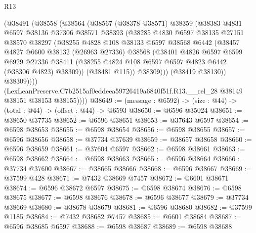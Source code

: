\begin{lexlean}{R13}
\begin{coremodule}
            (@38491
              (@38558
                (@38564
                  (@38567
                    (@38378 @38571)
                    @38359
                    (@38383
                      @4831
                      @6597
                      @38136
                      @37306
                      @38571
                      @38393
                      (@38285
                        @4830
                        @6597
                        @38135
                        @27151
                        @38570
                        @38297
                        (@38255
                          @4828
                          @108
                          @38133
                          @6597
                          @38568
                          @6442
                          (@38457
                            @4827
                            @6600
                            @38132
                            (@26963 @27336)
                            @38568
                            (@38401
                              @4826
                              @6597
                              @6599
                              @6929
                              @27336
                              @38411
                              (@38255 @4824 @108 @6597 @6597 @4823 @6442 (@38306 @4823) @38309))
                            (@38481 @115))
                          @38309)))
                    (@38419 @38130))
                  @38309))))
          (LexLeanPreserve.C7b2515af0eddeea59726419a6840f51f.R13.__rel_28
            @38149
            @38151
            @38153
            @38155))))
@38649 := (message : @6592) -> (size : @44) -> (total : @44) -> (offset : @44) -> @6593
@38650 := @6596 @35024
@38651 := @38650 @37735
@38652 := @6596 @38651
@38653 := @37643 @6597
@38654 := @6598 @38653
@38655 := @6598 @38654
@38656 := @6598 @38655
@38657 := @6596 @38656
@38658 := @37734 @37639
@38659 := @38657 @38658
@38660 := @6596 @38659
@38661 := @37604 @6597
@38662 := @6598 @38661
@38663 := @6598 @38662
@38664 := @6598 @38663
@38665 := @6596 @38664
@38666 := @37734 @37600
@38667 := @38665 @38666
@38668 := @6596 @38667
@38669 := @37599 @428
@38671 := @7432 @38669 @7457
@38672 := @6601 @38671
@38674 := @6596 @38672 @6597
@38675 := @6598 @38674
@38676 := @6598 @38675
@38677 := @6598 @38676
@38678 := @6596 @38677
@38679 := @37734 @38669
@38680 := @38678 @38679
@38681 := @6596 @38680
@38682 := @37599 @1185
@38684 := @7432 @38682 @7457
@38685 := @6601 @38684
@38687 := @6596 @38685 @6597
@38688 := @6598 @38687
@38689 := @6598 @38688

\end{coremodule}
\end{lexlean}
